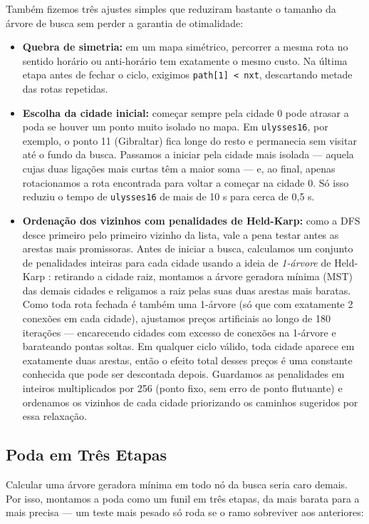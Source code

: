 \documentclass[12pt]{article}
\begin{document}
Também fizemos três ajustes simples que reduziram bastante o tamanho da árvore de busca sem perder a garantia de otimalidade:
\begin{itemize}
  \item \textbf{Quebra de simetria:} em um mapa simétrico, percorrer a mesma rota no sentido horário ou anti-horário tem exatamente o mesmo custo. Na última etapa antes de fechar o ciclo, exigimos \texttt{path[1] < nxt}, descartando metade das rotas repetidas.
  \item \textbf{Escolha da cidade inicial:} começar sempre pela cidade 0 pode atrasar a poda se houver um ponto muito isolado no mapa. Em \texttt{ulysses16}, por exemplo, o ponto 11 (Gibraltar) fica longe do resto e permanecia sem visitar até o fundo da busca. Passamos a iniciar pela cidade mais isolada — aquela cujas duas ligações mais curtas têm a maior soma — e, ao final, apenas rotacionamos a rota encontrada para voltar a começar na cidade 0. Só isso reduziu o tempo de \texttt{ulysses16} de mais de 10 s para cerca de 0,5 s.
  \item \textbf{Ordenação dos vizinhos com penalidades de Held-Karp:} como a DFS desce primeiro pelo primeiro vizinho da lista, vale a pena testar antes as arestas mais promissoras. Antes de iniciar a busca, calculamos um conjunto de penalidades inteiras para cada cidade usando a ideia de \textit{1-árvore} de Held-Karp \cite{held1970traveling}: retirando a cidade raiz, montamos a árvore geradora mínima (MST) das demais cidades e religamos a raiz pelas suas duas arestas mais baratas. Como toda rota fechada é também uma 1-árvore (só que com exatamente 2 conexões em cada cidade), ajustamos preços artificiais ao longo de 180 iterações — encarecendo cidades com excesso de conexões na 1-árvore e barateando pontas soltas. Em qualquer ciclo válido, toda cidade aparece em exatamente duas arestas, então o efeito total desses preços é uma constante conhecida que pode ser descontada depois. Guardamos as penalidades em inteiros multiplicados por 256 (ponto fixo, sem erro de ponto flutuante) e ordenamos os vizinhos de cada cidade priorizando os caminhos sugeridos por essa relaxação.
\end{itemize}

\subsection{Poda em Três Etapas}

Calcular uma árvore geradora mínima em todo nó da busca seria caro demais. Por isso, montamos a poda como um funil em três etapas, da mais barata para a mais precisa — um teste mais pesado só roda se o ramo sobreviver aos anteriores:
\end{document}
